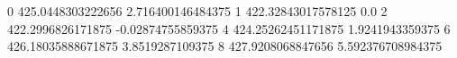 0 425.0448303222656 2.716400146484375
1 422.32843017578125 0.0
2 422.2996826171875 -0.02874755859375
4 424.25262451171875 1.9241943359375
6 426.18035888671875 3.8519287109375
8 427.9208068847656 5.592376708984375
